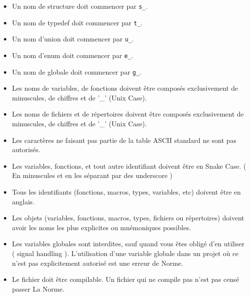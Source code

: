\documentclass{42-fr}
\begin{document}
        \begin{itemize}

            \item Un nom de structure doit commencer par
                \texttt{s\_}.

            \item Un nom de typedef doit commencer par
                \texttt{t\_}.

            \item Un nom d’union doit commencer par \texttt{u\_}.

            \item Un nom d’enum doit commencer par \texttt{e\_}.

            \item Un nom de globale doit commencer par \texttt{g\_}.

            \item Les noms de variables, de fonctions doivent être composés exclusivement de 
                minuscules, de chiffres et de '\_' (Unix Case).

            \item Les noms de fichiers et de répertoires doivent être composés exclusivement de
                minuscules, de chiffres et de '\_' (Unix Case).

            \item Les caractères ne faisant pas partie de la table ASCII standard 
                ne sont pas autorisés.

            \item Les variables, fonctions, et tout autre identifiant doivent être en Snake Case.
                ( En minuscules et en les séparant par des underscore )

            \item Tous les identifiants (fonctions, macros, types, variables, etc) 
                doivent être en anglais.

            \item Les objets (variables, fonctions, macros, types, fichiers ou répertoires) 
                doivent avoir les noms les plus explicites ou mnémoniques possibles.
            
            \item Les variables globales sont interdites, sauf quand vous êtes obligé d'en utiliser ( signal handling ). L’utilisation d'une variable globale 
                dans un projet où ce n’est pas explicitement autorisé est une erreur de Norme.

            \item Le fichier doit être compilable. Un fichier qui ne compile pas n'est 
                pas censé passer La Norme.
        \end{itemize}
\newpage
\end{document}
